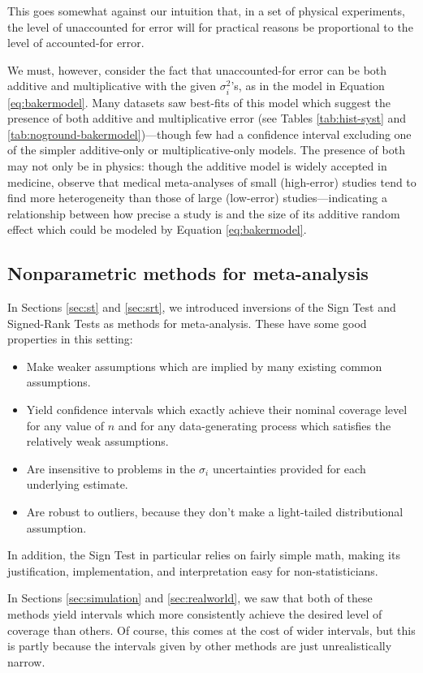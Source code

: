 \documentclass[letterpaper,12pt]{article}
\begin{document}
This goes somewhat against our intuition that, in a set of physical experiments, the level of unaccounted for error will for practical reasons be proportional to the level of accounted-for error.

We must, however, consider the fact that unaccounted-for error can be both additive and multiplicative with the given $\sigma_i^2$'s, as in the model in Equation \ref{eq:bakermodel}. Many datasets saw best-fits of this model which suggest the presence of both additive and multiplicative error (see Tables \ref{tab:hist-syst} and \ref{tab:noground-bakermodel})---though few had a confidence interval excluding one of the simpler additive-only or multiplicative-only models. The presence of both may not only be in physics: though the additive model is widely accepted in medicine, \cite{inthout2015small} observe that medical meta-analyses of small (high-error) studies tend to find more heterogeneity than those of large (low-error) studies---indicating a relationship between how precise a study is and the size of its additive random effect which could be modeled by Equation \ref{eq:bakermodel}.

\subsection{Nonparametric methods for meta-analysis}
In Sections \ref{sec:st} and \ref{sec:srt}, we introduced inversions of the Sign Test and Signed-Rank Tests as methods for meta-analysis. These have some good properties in this setting:
\begin{itemize}
\item Make weaker assumptions which are implied by many existing common assumptions.
\item Yield confidence intervals which exactly achieve their nominal coverage level for any value of $n$ and for any data-generating process which satisfies the relatively weak assumptions.
\item Are insensitive to problems in the $\sigma_i$ uncertainties provided for each underlying estimate.
\item Are robust to outliers, because they don't make a light-tailed distributional assumption.
\end{itemize}
In addition, the Sign Test in particular relies on fairly simple math, making its justification, implementation, and interpretation easy for non-statisticians.

In Sections \ref{sec:simulation} and \ref{sec:realworld}, we saw that both of these methods yield intervals which more consistently achieve the desired level of coverage than others. Of course, this comes at the cost of wider intervals, but this is partly because the intervals given by other methods are just unrealistically narrow.
\end{document}
